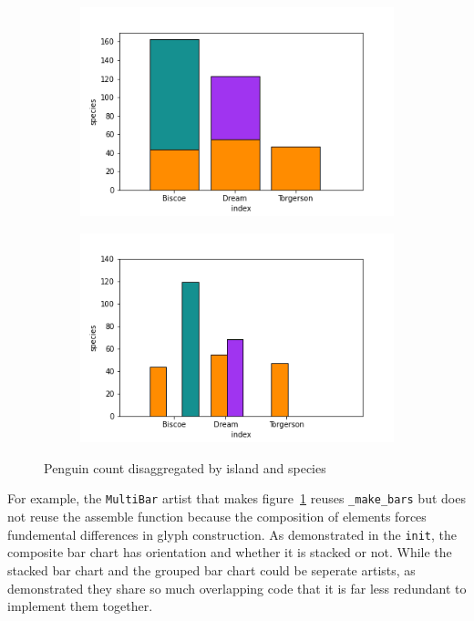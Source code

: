 \documentclass[../main.tex]{subfiles}
\begin{document}
\begin{figure}[H]
    \begin{subfigure}{0.5\textwidth}
        \includegraphics[width=\textwidth]{figures/code/bar_stacked.png}
    \end{subfigure}
    \begin{subfigure}{0.5\textwidth}
        \includegraphics[width=\textwidth]{figures/code/bar_grouped.png}
    \end{subfigure}
    \caption{Penguin count disaggregated by island and species}
    \label{fig:code_bar_multi}
\end{figure}

For example, the \texttt{MultiBar} artist that makes figure~\ref{fig:code_bar_multi} reuses \texttt{_make_bars} but does not reuse the assemble function because the composition of elements forces fundemental differences in glyph construction. As demonstrated in the \texttt{init}, the composite bar chart has orientation and whether it is stacked or not. While the stacked bar chart and the grouped bar chart could be seperate artists, as demonstrated they share so much overlapping code that it is far less redundant to implement them together.  
\end{document}
